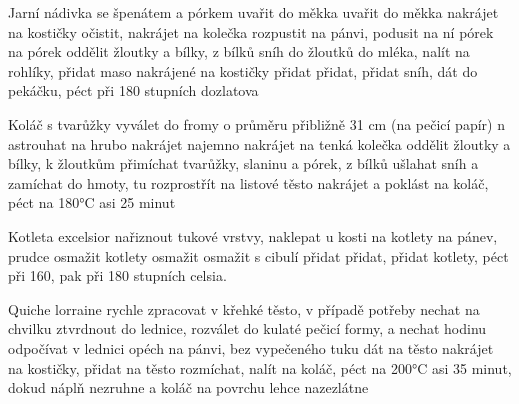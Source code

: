 \documentclass[12pt,a4paper]{article}
\begin{document}
\begin{recipe}{Jarní nádivka se špenátem a pórkem}
   uvařit do měkka
   uvařit do měkka
   nakrájet na kostičky
   očistit, nakrájet na kolečka
   rozpustit na pánvi, podusit na ní pórek
   na pórek
   oddělit žloutky a bílky, z bílků sníh
   do žloutků
   do mléka, nalít na rohlíky, přidat maso nakrájené na kostičky
   přidat
   přidat, přidat sníh, dát do pekáčku, péct při 180 stupních dozlatova
\end{recipe}
\newpage

\begin{recipe}{Koláč s tvarůžky}
   vyválet do fromy o průměru přibližně 31 cm (na pečicí papír)
   n astrouhat na hrubo
   nakrájet najemno
   nakrájet na tenká kolečka
   oddělit žloutky a bílky, k žloutkům přimíchat tvarůžky, slaninu a pórek, z bílků ušlahat sníh a zamíchat do hmoty, tu rozprostřít na listové těsto
   nakrájet a poklást na koláč, péct na 180°C asi 25 minut
\end{recipe}
\newpage

\begin{recipe}{Kotleta excelsior}
   nařiznout tukové vrstvy, naklepat u kosti
   na kotlety
   na pánev, prudce osmažit kotlety
   osmažit
   osmažit s cibulí
   přidat
   přidat, přidat kotlety, péct při 160, pak při 180 stupních celsia.
\end{recipe}
\newpage

\begin{recipe}{Quiche lorraine}
   rychle zpracovat v křehké těsto, v případě potřeby nechat na chvilku ztvrdnout do lednice, rozválet do kulaté pečicí formy,
    a nechat hodinu odpočívat v lednici
   opéch na pánvi, bez vypečeného tuku dát na těsto
   nakrájet na kostičky, přidat na těsto
   rozmíchat, nalít na koláč, péct na 200°C asi 35 minut, dokud náplň nezruhne a koláč na povrchu lehce nazezlátne
\end{recipe}
\newpage
\end{document}
